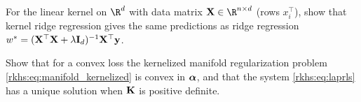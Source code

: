 \begin{notechapter}
\begin{exercise}\label{rkhs:exr:4}
For the linear kernel on $\R^d$ with data matrix $\mat X \in \R^{n\times d}$ (rows $x_i^\top$), show that kernel ridge regression gives the same predictions as ridge regression $w^* = (\mathbf{X}^\top\mathbf{X} + \lambda\mathbf{I}_d)^{-1}\mathbf{X}^\top\mathbf{y}$.
\end{exercise}

\begin{exercise}\label{rkhs:exr:5}
Show that for a convex loss the kernelized manifold regularization problem \eqref{rkhs:eq:manifold_kernelized} is convex in $\boldsymbol{\alpha}$, and that the system \eqref{rkhs:eq:laprls} has a unique solution when $\mathbf{K}$ is positive definite.
\end{exercise}
\end{notechapter}
